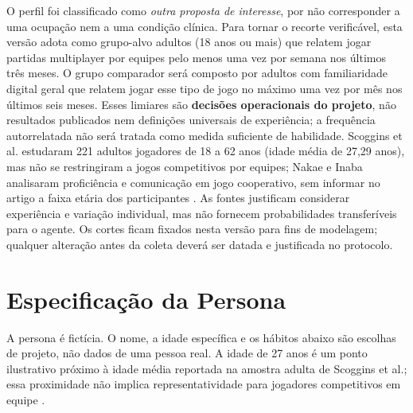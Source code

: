 \documentclass[conference]{IEEEtran}
\begin{document}
O perfil foi classificado como \textit{outra proposta de interesse}, por não corresponder a uma ocupação nem a uma condição clínica. Para tornar o recorte verificável, esta versão adota como grupo-alvo adultos (18 anos ou mais) que relatem jogar partidas multiplayer por equipes pelo menos uma vez por semana nos últimos três meses. O grupo comparador será composto por adultos com familiaridade digital geral que relatem jogar esse tipo de jogo no máximo uma vez por mês nos últimos seis meses. Esses limiares são \textbf{decisões operacionais do projeto}, não resultados publicados nem definições universais de experiência; a frequência autorrelatada não será tratada como medida suficiente de habilidade. Scoggins et al. estudaram 221 adultos jogadores de 18 a 62 anos (idade média de 27,29 anos), mas não se restringiram a jogos competitivos por equipes; Nakae e Inaba analisaram proficiência e comunicação em jogo cooperativo, sem informar no artigo a faixa etária dos participantes \cite{scoggins2025,nakae2025}. As fontes justificam considerar experiência e variação individual, mas não fornecem probabilidades transferíveis para o agente. Os cortes ficam fixados nesta versão para fins de modelagem; qualquer alteração antes da coleta deverá ser datada e justificada no protocolo.

\section{Especificação da Persona}

A persona é fictícia. O nome, a idade específica e os hábitos abaixo são escolhas de projeto, não dados de uma pessoa real. A idade de 27 anos é um ponto ilustrativo próximo à idade média reportada na amostra adulta de Scoggins et al.; essa proximidade não implica representatividade para jogadores competitivos em equipe \cite{scoggins2025}.
\end{document}
